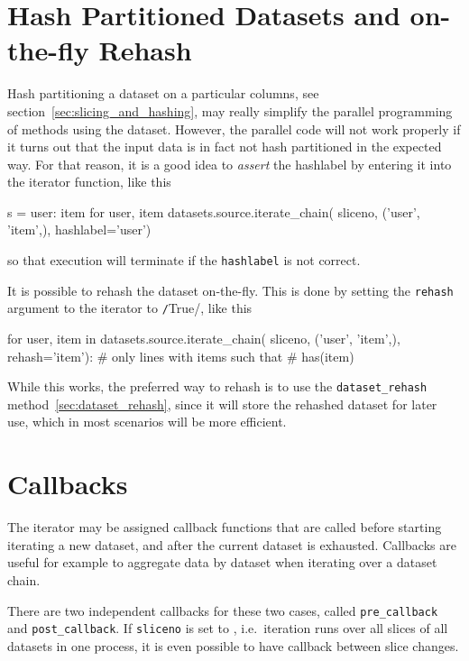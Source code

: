 \section{Hash Partitioned Datasets and on-the-fly Rehash}
Hash partitioning a dataset on a particular columns, see
section~\ref{sec:slicing_and_hashing}, may really simplify the
parallel programming of methods using the dataset.  However, the
parallel code will not work properly if it turns out that the input
data is in fact not hash partitioned in the expected way.  For that
reason, it is a good idea to \emph{assert} the hashlabel by entering
it into the iterator function, like this
\begin{python}
s = {user: item for user, item datasets.source.iterate_chain(
     sliceno, ('user', 'item',), hashlabel='user')}
\end{python}
so that execution will terminate if the \texttt{hashlabel} is not correct.

It is possible to rehash the dataset on-the-fly.  This is done by
setting the \texttt{rehash} argument to the iterator to
\texttt/True/, like this
\begin{python}
for user, item in datasets.source.iterate_chain(
                       sliceno, ('user', 'item',),
                       rehash='item'):
    # only lines with items such that
    # has(item) %
\end{python}
While this works, the preferred way to rehash is to use the
\texttt{dataset\_rehash} method~\ref{sec:dataset_rehash},
since it will store the rehashed dataset for later use, which in most
scenarios will be more efficient.






\section{Callbacks}
\label{sec:callback}
The iterator may be assigned callback functions that are called before
starting iterating a new dataset, and after the current dataset is
exhausted.  Callbacks are useful for example to aggregate data by
dataset when iterating over a dataset chain.

There are two independent callbacks for these two cases,
called \texttt{pre\_callback} and \texttt{post\_callback}.
If \texttt{sliceno} is set to \pyNone, i.e.\ iteration runs over all
slices of all datasets in one process, it is even possible to have
callback between slice changes.

